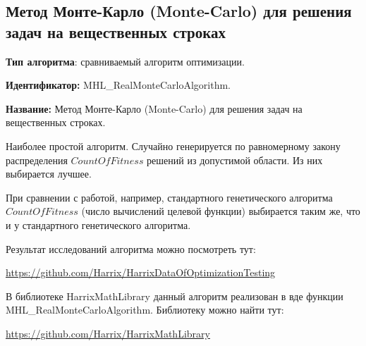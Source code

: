 \subsection{Метод Монте-Карло (Monte-Carlo) для решения задач на вещественных строках}\label{HarrixOptimizationAlgorithms:MHL_RealMonteCarloAlgorithm}

\textbf{Тип алгоритма}: сравниваемый алгоритм оптимизации.

\textbf{Идентификатор:} MHL\_RealMonteCarloAlgorithm.

\textbf{Название:} Метод Монте-Карло (Monte-Carlo) для решения задач на вещественных строках.

Наиболее простой алгоритм. Случайно генерируется по равномерному закону распределения $ CountOfFitness $ решений из допустимой области. Из них выбирается лучшее.

При сравнении с работой, например, стандартного генетического алгоритма $ CountOfFitness $ (число вычислений целевой функции) выбирается таким же, что и у стандартного генетического алгоритма.

Результат исследований алгоритма можно посмотреть тут:

\href{https://github.com/Harrix/HarrixDataOfOptimizationTesting}{https://github.com/Harrix/HarrixDataOfOptimizationTesting}

В библиотеке HarrixMathLibrary данный алгоритм реализован в вде функции MHL\_RealMonteCarloAlgorithm. Библиотеку можно найти тут:

\href{https://github.com/Harrix/HarrixMathLibrary}{https://github.com/Harrix/HarrixMathLibrary}